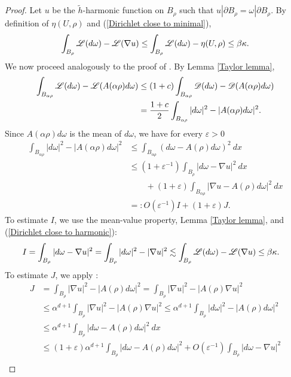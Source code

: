 \begin{proof}
Let $u$ be the $\tilde h$-harmonic function on $B_\rho$ such that $u|\partial B_\rho = \omega|\partial B_\rho$.
By definition of $\eta(U, \rho)$ and (\ref{Dirichlet close to minimal}),
\begin{equation}\label{Dirichlet close to harmonic}
\int_{B_\rho} \mathscr L(d\omega) - \mathscr L(\nabla u) \leq \int_{B_\rho} \mathscr L(d\omega) - \eta(U, \rho) \leq \beta\kappa.
\end{equation}
We now proceed analogously to the proof of \cite[Lemma 4.2]{Miranda66}. By Lemma \ref{Taylor lemma},
\begin{align*}
\int_{B_{\alpha\rho}} \mathscr L(d\omega) - \mathscr L(A(\alpha\rho)d\omega) &\leq (1 + c)\int_{B_{\alpha\rho}} \mathscr D(d\omega) - \mathscr D(A(\alpha\rho)d\omega) \\
&= \frac{1 + c}{2} \int_{B_{\alpha\rho}} |d\omega|^2 - |A(\alpha\rho)d\omega|^2.
\end{align*}
Since $A(\alpha\rho)d\omega$ is the mean of $d\omega$, we have for every $\varepsilon > 0$
\begin{align*}
\int_{B_{\alpha\rho}} |d\omega|^2 - |A(\alpha\rho)d\omega|^2 &\leq \int_{B_{\alpha\rho}} (d\omega - A(\rho)d\omega)^2 ~dx \\
&\leq (1 + \varepsilon^{-1})\int_{B_\rho} |d\omega - \nabla u|^2 ~dx\\
&\qquad + (1 + \varepsilon) \int_{B_{\alpha\rho}} |\nabla u - A(\rho)d\omega|^2 ~dx\\
&=: O(\varepsilon^{-1})I + (1 + \varepsilon)J.
\end{align*}
To estimate $I$, we use the mean-value property, Lemma \ref{Taylor lemma}, and (\ref{Dirichlet close to harmonic}):
\begin{align*}
I &= \int_{B_\rho} |d\omega - \nabla u|^2 = \int_{B_\rho} |d\omega|^2 - |\nabla u|^2 \lesssim \int_{B_\rho} \mathscr L(d\omega) - \mathscr L(\nabla u) \leq \beta \kappa.
\end{align*}
To estimate $J$, we apply \cite[Lemma 4.1]{Miranda66}:
\begin{align*}
J &= \int_{B_\rho} |\nabla u|^2 - |A(\rho)d\omega|^2 = \int_{B_\rho} |\nabla u|^2 - |A(\rho)\nabla u|^2 \\
&\leq \alpha^{d + 1} \int_{B_\rho} |\nabla u|^2 - |A(\rho)\nabla u|^2 \leq \alpha^{d + 1} \int_{B_\rho} |d\omega|^2 - |A(\rho)d\omega|^2 \\
&\leq \alpha^{d + 1} \int_{B_\rho} |d\omega - A(\rho)d\omega|^2 ~dx \\
&\leq (1 + \varepsilon)\alpha^{d + 1} \int_{B_\rho} |d\omega - A(\rho)d\omega|^2  + O(\varepsilon^{-1})\int_{B_\rho} |d\omega - \nabla u|^2\\

\end{align*}
\end{proof}

